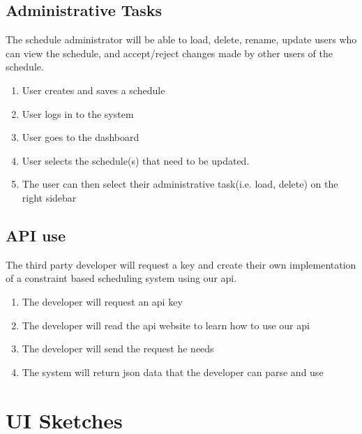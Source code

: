 \documentclass{extarticle}
\begin{document}
\begin{appendices}

\subsection{Administrative Tasks}
The schedule administrator will be able to load, delete, rename, update users who can view the schedule, and accept/reject
changes made by other users of the schedule.
\begin{enumerate}
    \item User creates and saves a schedule
    \item User logs in to the system
    \item User goes to the dashboard
    \item User selects the schedule(s) that need to be updated.
    \item The user can then select their administrative task(i.e. load, delete) on the right sidebar
\end{enumerate}


\subsection{API use}
The third party developer will request a key and create their own implementation of a constraint based scheduling
system using our api.

\begin{enumerate}
    \item The developer will request an api key
    \item The developer will read the api website to learn how to use our api
    \item The developer will send the request he needs
    \item The system will return json data that the developer can parse and use
\end{enumerate}

\clearpage

\section{UI Sketches}


\end{appendices}
\end{document}
